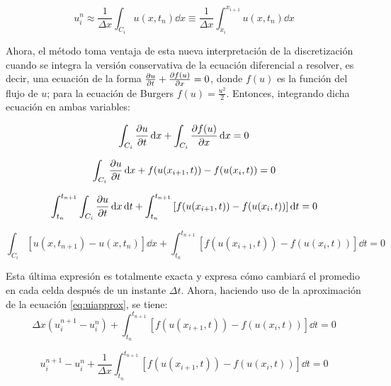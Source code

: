 \documentclass[12pt]{article}
\begin{document}
	\begin{equation}
		u_{i}^{n} \approx \frac{1}{\Delta x} \int_{C_i} u(x,t_n) \dd{x} \equiv \frac{1}{\Delta x} \int_{x_i}^{x_{i+1}} u(x,t_n) \dd{x}
		\label{eq:uiapprox}
	\end{equation}
	
	Ahora, el método toma ventaja de esta nueva interpretación de la discretización cuando se integra la versión conservativa de la ecuación diferencial a resolver, es decir, una ecuación de la forma $\pdv{u}{t} + \pdv{f(u)}{x} = 0$, donde $f(u)$ es la función del flujo de $u$; para la ecuación de Burgers $f(u) = \frac{u^2}{2}$. Entonces, integrando dicha ecuación en ambas variables:
	
	\begin{equation}
		\int_{C_i} \pdv{u}{t} \dd{x} + \int_{C_i} \pdv{f(u)}{x} \dd{x} = 0
	\end{equation}

	\begin{equation}
		\int_{C_i} \pdv{u}{t} \dd{x} + f(u(x_{i+1} ,t)) - f(u(x_{i},t)) = 0
	\end{equation}

	\begin{equation}
		\int_{t_n}^{t_{n+1}} \int_{C_i} \pdv{u}{t} \dd{x} \dd{t} + \int_{t_n}^{t_{n+1}}\left[ f(u(x_{i+1} ,t)) - f(u(x_{i},t))\right]\dd{t} = 0
	\end{equation}

	\begin{equation}
		\int_{C_i} \left[u(x, t_{n+1}) - u(x, t_n)\right] \dd{x} + \int_{t_n}^{t_{n+1}}\left[ f(u(x_{i+1} ,t)) - f(u(x_{i},t))\right]\dd{t} = 0 
	\end{equation}
	
	Esta última expresión es totalmente exacta y expresa cómo cambiará el promedio en cada celda después de un instante $\Delta t$. Ahora, haciendo uso de la aproximación de la ecuación \ref{eq:uiapprox}, se tiene:
	\begin{equation}
		 \Delta x\left( u_{i}^{n+1} - u_{i}^{n}\right)   + \int_{t_n}^{t_{n+1}}\left[ f(u(x_{i+1} ,t)) - f(u(x_{i},t))\right]\dd{t} = 0 
	\end{equation}

	\begin{equation}
		u_{i}^{n+1} - u_{i}^{n} + \frac{1}{\Delta x}\int_{t_n}^{t_{n+1}}\left[ f(u(x_{i+1} ,t)) - f(u(x_{i},t))\right]\dd{t} = 0 
	\end{equation}
\end{document}
